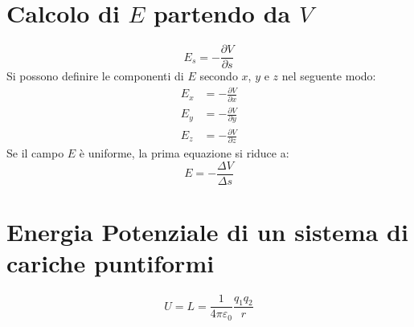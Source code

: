         \section*{Calcolo di $E$ partendo da $V$}
            \begin{equation*}
                E_s = - \frac{\partial V}{\partial s}
            \end{equation*}
        Si possono definire le componenti di $E$ secondo $x$, $y$ e $z$ nel 
        seguente modo:
            \begin{align*}
                E_x &= - \frac{\partial V}{\partial x}\\
                E_y &= - \frac{\partial V}{\partial y}\\
                E_z &= - \frac{\partial V}{\partial z}
            \end{align*}
        Se il campo $E$ è uniforme, la prima equazione si riduce a:
            \begin{equation*}
                E = - \frac{\Delta V}{\Delta s}
            \end{equation*}

        \section*{Energia Potenziale di un sistema di cariche puntiformi} 
            \begin{equation*}
                U = L = \frac{1}{4\pi\varepsilon_0}\frac{q_1q_2}{r}
            \end{equation*}